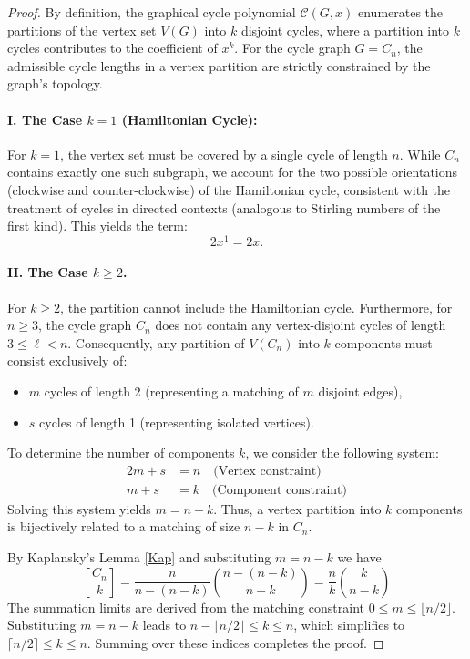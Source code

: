 \documentclass{amsart}
\theoremstyle{definition}
\newcommand{\stirlgraph}[2]{\genfrac{[}{]}{0pt}{}{#1}{#2}}
\begin{document}
\begin{proof}
By definition, the graphical cycle polynomial $\mathcal{C}(G, x)$ enumerates the partitions of the vertex set $V(G)$ into $k$ disjoint cycles, where a partition into $k$ cycles contributes to the coefficient of $x^k$. For the cycle graph $G = C_n$, the admissible cycle lengths in a vertex partition are strictly constrained by the graph's topology.

\paragraph{I. The Case $k=1$ (Hamiltonian Cycle):}
For $k=1$, the vertex set must be covered by a single cycle of length $n$. While $C_n$ contains exactly one such subgraph, we account for the two possible orientations (clockwise and counter-clockwise) of the Hamiltonian cycle, consistent with the treatment of cycles in directed contexts (analogous to Stirling numbers of the first kind). This yields the term:
\begin{equation*}
    2x^1 = 2x.
\end{equation*}

\paragraph{II. The Case $k \geq 2$.}
For $k \geq 2$, the partition cannot include the Hamiltonian cycle. Furthermore, for $n \geq 3$, the cycle graph $C_n$ does not contain any vertex-disjoint cycles of length $3 \leq \ell < n$. Consequently, any partition of $V(C_n)$ into $k$ components must consist exclusively of:
\begin{itemize}
    \item $m$ cycles of length 2 (representing a matching of $m$ disjoint edges),
    \item $s$ cycles of length 1 (representing isolated vertices).
\end{itemize}

To determine the number of components $k$, we consider the following system:
\begin{align}
    2m + s &= n \quad \text{(Vertex constraint)} \\
    m + s &= k \quad \text{(Component constraint)}
\end{align}
Solving this system yields $m = n - k$. Thus, a vertex partition into $k$ components is bijectively related to a matching of size $n-k$ in $C_n$.

By Kaplansky's Lemma \ref{Kap} and substituting $m = n - k$ we have
\begin{equation*}
    \stirlgraph{C_n}{k} = \frac{n}{n - (n - k)} \binom{n - (n - k)}{n - k} = \frac{n}{k} \binom{k}{n - k}
\end{equation*}
The summation limits are derived from the matching constraint $0 \leq m \leq \lfloor n/2 \rfloor$. Substituting $m = n-k$ leads to $n - \lfloor n/2 \rfloor \leq k \leq n$, which simplifies to $\lceil n/2 \rceil \leq k \leq n$. Summing over these indices completes the proof.
\end{proof}
\end{document}

